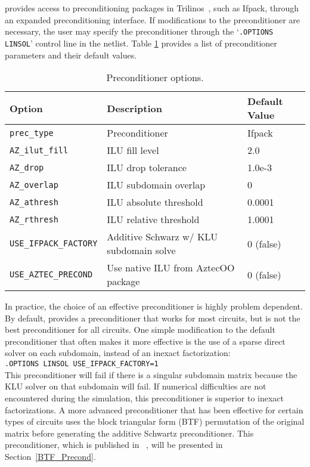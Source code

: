 \Xyce{} provides access to preconditioning packages in Trilinos~\cite{trilinos:toms}, 
such as Ifpack, through an expanded preconditioning interface.  
If modifications to the preconditioner are necessary, the user may specify the preconditioner 
through the `\texttt{.OPTIONS LINSOL}' control line in the netlist. 
Table \ref{tab:prec_options} provides a list of preconditioner parameters and
their default values.  

\begin{table}[htp]
\caption[Preconditioner options.]{Preconditioner options.}
\label{tab:prec_options}
\begin{center}
\begin{tabular}{| p{3.5cm} | p{8cm} | p{2.5cm} |}
\hline
Option & Description & Default Value \\
\hline
{\tt prec\_type}           & Preconditioner & Ifpack \\
{\tt AZ\_ilut\_fill}       & ILU fill level & 2.0 \\
{\tt AZ\_drop}             & ILU drop tolerance & 1.0e-3 \\
{\tt AZ\_overlap}          & ILU subdomain overlap & 0 \\
{\tt AZ\_athresh}          & ILU absolute threshold & 0.0001 \\
{\tt AZ\_rthresh}          & ILU relative threshold & 1.0001 \\
{\tt USE\_IFPACK\_FACTORY} & Additive Schwarz w/ KLU subdomain solve & 0 (false) \\ 
{\tt USE\_AZTEC\_PRECOND} & Use native ILU from AztecOO package & 0 (false) \\
\hline
\end{tabular}
\end{center}
\end{table}

In practice, the choice of an effective preconditioner is highly problem dependent.  By default,
\Xyce{} provides a preconditioner that works for most circuits, but is not the best preconditioner
for all circuits.  One simple modification to the default preconditioner that often makes it more
effective is the use of a sparse direct solver on each subdomain, instead of an inexact factorization: \\[0.5em] 
\noindent \verb|.OPTIONS LINSOL USE_IFPACK_FACTORY=1| \\[0.5em]
This preconditioner will fail if there is a singular subdomain matrix because the KLU solver on that subdomain will fail.
If numerical difficulties are not encountered during the simulation, this preconditioner is superior to inexact factorizations.
A more advanced preconditioner that has been effective for certain types of circuits uses the block triangular form (BTF)
permutation of the original matrix before generating the additive Schwartz preconditioner.  This preconditioner, which
is published in ~\cite{ICCAD09_precond}, will be presented in Section~\ref{BTF_Precond}.


